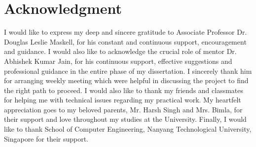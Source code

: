 
\chapter*{Acknowledgment} 
\label{ch0_Acknowledgement}
I would like to express my deep and sincere gratitude to Associate Professor Dr. Douglas Leslie Maskell, for his constant and continuous support, encouragement and guidance. I would also like to acknowledge the crucial role of mentor Dr. Abhishek Kumar Jain, for his continuous support, effective suggestions and professional guidance in the entire phase of my dissertation. I sincerely thank him for arranging weekly meeting which were helpful in discussing the project to find the right path to proceed. I would also like to thank my friends and classmates for helping me with technical issues regarding my practical work. My heartfelt appreciation goes to my beloved parents, Mr. Harsh Singh and Mrs. Bimla, for their support and love throughout my studies at the University. Finally, I would like to thank School of Computer Engineering, Nanyang Technological University, Singapore for their support.